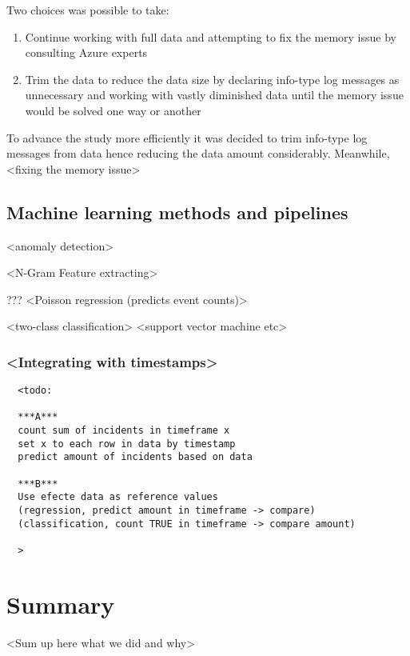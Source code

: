 \documentclass[english, 12pt, a4paper, elec, utf8, a-1b, online]{aaltothesis}
\begin{document}
Two choices was possible to take:
\begin{enumerate}
  \item Continue working with full data
  and attempting to fix the memory issue
  by consulting Azure experts
  \item  Trim the data to reduce the data size
  by declaring info-type log messages
  as unnecessary
  and working with vastly diminished data
  until the memory issue would be solved
  one way or another
\end{enumerate}

To advance the study more efficiently
it was decided to trim info-type log messages from data
hence reducing the data amount considerably.
Meanwhile,
<fixing the memory issue>

\subsection{Machine learning methods and pipelines}

<anomaly detection>

<N-Gram Feature extracting>

???
<Poisson regression (predicts event counts)>

<two-class classification>
<support vector machine etc>



\subsubsection*{<Integrating with timestamps>}


\begin{verbatim}
  <todo:

  ***A***
  count sum of incidents in timeframe x
  set x to each row in data by timestamp
  predict amount of incidents based on data

  ***B***
  Use efecte data as reference values
  (regression, predict amount in timeframe -> compare)
  (classification, count TRUE in timeframe -> compare amount)

  >
\end{verbatim}

\clearpage

\section{Summary}

<Sum up here what we did and why>
\end{document}
